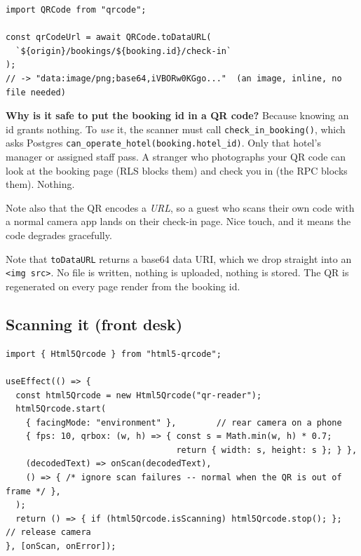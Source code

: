 \documentclass[11pt,a4paper]{article}
\begin{document}
\begin{lstlisting}[language=TS,caption={components/SuccessClient.tsx / app/bookings/[id]/page.tsx}]
import QRCode from "qrcode";

const qrCodeUrl = await QRCode.toDataURL(
  `${origin}/bookings/${booking.id}/check-in`
);
// -> "data:image/png;base64,iVBORw0KGgo..."  (an image, inline, no file needed)
\end{lstlisting}

\begin{notebox}
\textbf{Why is it safe to put the booking id in a QR code?} Because knowing an id
grants nothing. To \emph{use} it, the scanner must call
\texttt{check\_in\_booking()}, which asks Postgres
\texttt{can\_operate\_hotel(booking.hotel\_id)}. Only that hotel's manager or
assigned staff pass. A stranger who photographs your QR code can look at the
booking page (RLS blocks them) and check you in (the RPC blocks them). Nothing.

Note also that the QR encodes a \emph{URL}, so a guest who scans their own code
with a normal camera app lands on their check-in page. Nice touch, and it means
the code degrades gracefully.
\end{notebox}

Note that \texttt{toDataURL} returns a base64 data URI, which we drop straight
into an \texttt{<img src>}. No file is written, nothing is uploaded, nothing is
stored. The QR is regenerated on every page render from the booking id.

\subsection{Scanning it (front desk)}

\begin{lstlisting}[language=TS,caption={app/manager/manage/[hotelId]/FrontDesk.tsx}]
import { Html5Qrcode } from "html5-qrcode";

useEffect(() => {
  const html5Qrcode = new Html5Qrcode("qr-reader");
  html5Qrcode.start(
    { facingMode: "environment" },        // rear camera on a phone
    { fps: 10, qrbox: (w, h) => { const s = Math.min(w, h) * 0.7;
                                  return { width: s, height: s }; } },
    (decodedText) => onScan(decodedText),
    () => { /* ignore scan failures -- normal when the QR is out of frame */ },
  );
  return () => { if (html5Qrcode.isScanning) html5Qrcode.stop(); };  // release camera
}, [onScan, onError]);
\end{lstlisting}
\end{document}
